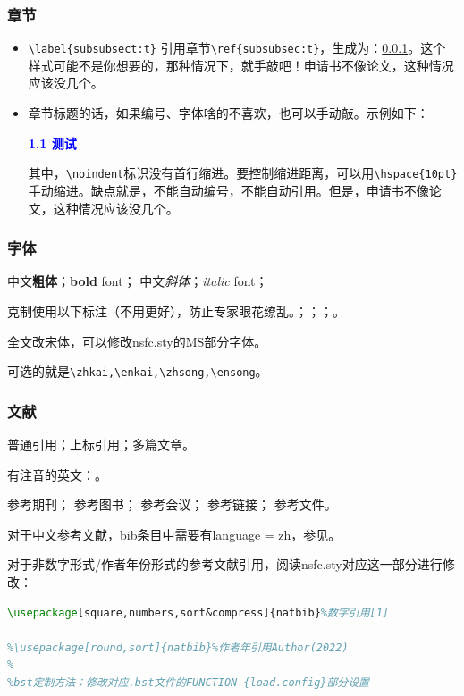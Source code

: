 \begin{refsection}
\subsubsection{章节}\label{subsubsec:t}

\begin{itemize}
	\item \verb|\label{subsubsect:t}|
	引用章节\verb|\ref{subsubsec:t}|，生成为：\ref{subsubsec:t}。这个样式可能不是你想要的，那种情况下，就手敲吧！申请书不像论文，这种情况应该没几个。
	\item 章节标题的话，如果编号、字体啥的不喜欢，也可以手动敲。示例如下：
	
	\noindent\textcolor{blue}{\textbf{1.1 测试}}
	
	其中，\verb|\noindent|标识没有首行缩进。要控制缩进距离，可以用\verb|\hspace{10pt}|手动缩进。缺点就是，不能自动编号，不能自动引用。但是，申请书不像论文，这种情况应该没几个。
\end{itemize}

\subsubsection{字体}
中文\textbf{粗体}；\textbf{bold} font；
中文\textit{斜体}；\textit{italic} font；

克制使用以下标注（不用更好），防止专家眼花缭乱。；；；。

全文改宋体，可以修改nsfc.sty的MS部分字体。

可选的就是\verb|\zhkai,\enkai,\zhsong,\ensong|。

\subsubsection{文献}
普通引用\cite{test}；上标引用；多篇文章。

有注音的英文：\cite{test}。

参考期刊\cite{test}；
参考图书\cite{test2}；
参考会议\cite{test5}；
参考链接\cite{test4}；
参考文件\cite{test6}。

对于中文参考文献，bib条目中需要有language = {zh}，参见\cite{test2}。

对于非数字形式/作者年份形式的参考文献引用，阅读nsfc.sty对应这一部分进行修改：
\begin{lstlisting}[language=tex, basicstyle=\ttfamily\small, keywordstyle=\color{blue}, commentstyle=\color{gray}]
\usepackage[square,numbers,sort&compress]{natbib}%数字引用[1]

%\usepackage[round,sort]{natbib}%作者年引用Author(2022)
%
%bst定制方法：修改对应.bst文件的FUNCTION {load.config}部分设置
\end{lstlisting}


\end{refsection}
